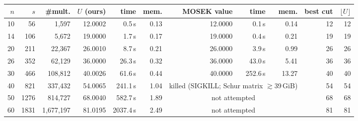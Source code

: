 \begin{tabular}{r r r r r r r r r r r}\toprule
$n$ & $s$ & \#mult. & $U$ (ours) & time & mem. & MOSEK value & time & mem. & best cut & $\lfloor U\rfloor$ \\\midrule
10 & 56 & 1{,}597 & 12.0002 & 0.5\,s & 0.13 & 12.0000 & 0.1\,s & 0.14 & 12 & 12 \\
14 & 106 & 5{,}672 & 19.0000 & 1.7\,s & 0.17 & 19.0000 & 0.4\,s & 0.21 & 19 & 19 \\
20 & 211 & 22{,}367 & 26.0010 & 8.7\,s & 0.21 & 26.0000 & 3.9\,s & 0.99 & 26 & 26 \\
26 & 352 & 62{,}129 & 36.0000 & 26.3\,s & 0.32 & 36.0000 & 43.0\,s & 5.41 & 36 & 36 \\
30 & 466 & 108{,}812 & 40.0026 & 61.6\,s & 0.44 & 40.0000 & 252.6\,s & 13.27 & 40 & 40 \\
40 & 821 & 337{,}432 & 54.0065 & 241.1\,s & 1.04 & \multicolumn{3}{c}{killed (SIGKILL; Schur matrix $\gtrsim$39\,GiB)} & 54 & 54 \\
50 & 1276 & 814{,}727 & 68.0040 & 582.7\,s & 1.89 & \multicolumn{3}{c}{not attempted} & 68 & 68 \\
60 & 1831 & 1{,}677{,}197 & 81.0195 & 2037.4\,s & 2.49 & \multicolumn{3}{c}{not attempted} & 81 & 81 \\
\bottomrule\end{tabular}
